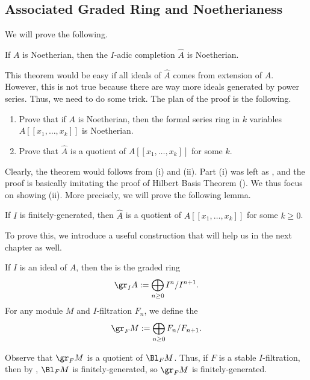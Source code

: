 \subsection{Associated Graded Ring and Noetherianess}
We will prove the following.
\begin{theorem}
    \label{thm:completion_is_noetherian}
    If $A$ is Noetherian, then the $I$-adic completion
    $\widehat A$ is Noetherian.
\end{theorem}
This theorem would be easy if all ideals of $\widehat A$
comes from extension of $A$.
However, this is not true because there are way more ideals
generated by power series. Thus, we need to do some trick.
The plan of the proof is the following.
\begin{enumerate}[label=(\roman*)]
    \item Prove that if $A$ is Noetherian,
    then the formal series ring in $k$ variables
    $A[[x_1,\dots,x_k]]$ is Noetherian.
    \item Prove that $\widehat A$ is a quotient 
    of $A[[x_1,\dots,x_k]]$ for some $k$.
\end{enumerate}
Clearly, the theorem would follows from (i) and (ii).
Part (i) was left as ,
and the proof is basically imitating the proof of 
Hilbert Basis Theorem ().
We thus focus on showing (ii).
More precisely, we will prove the following lemma.
\begin{proposition}
    \label{prop:completion_is_quotient}
    If $I$ is finitely-generated, then
    $\widehat A$ is a quotient of $A[[x_1,\dots,x_k]]$
    for some $k\geq 0$.
\end{proposition}
To prove this, we introduce a useful construction
that will help us in the next chapter as well.
\begin{definition}
\label{def:gr}
If $I$ is an ideal of $A$, then the 
is the graded ring
    $$\gr_I A := \bigoplus_{n\geq 0} I^n/I^{n+1}.$$
For any module $M$ and $I$-filtration $F_n$,
we define the 
$$\gr_F M := \bigoplus_{n\geq 0} F_n/F_{n+1}.$$
\end{definition}
Observe that $\gr_F M$ is a quotient of $\Bl_F M$.
Thus, if $F$ is a stable $I$-filtration,
then by , $\Bl_F M$ is finitely-generated,
so $\gr_F M$ is finitely-generated.

